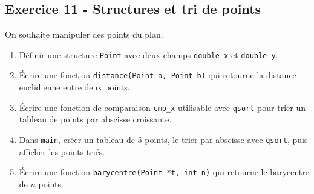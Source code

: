 \documentclass[12pt,a4paper]{article}
\begin{document}
\subsection*{Exercice 11 - Structures et tri de points \niveau{\moyen}}

\begin{boiteexercice}
On souhaite manipuler des points du plan.
\begin{enumerate}
  \item Définir une structure \texttt{Point} avec deux champs \texttt{double x} et \texttt{double y}.
  \item Écrire une fonction \texttt{distance(Point a, Point b)} qui retourne la distance euclidienne entre deux points.
  \item Écrire une fonction de comparaison \texttt{cmp\_x} utilisable avec \texttt{qsort} pour trier un tableau de points par abscisse croissante.
  \item Dans \texttt{main}, créer un tableau de 5 points, le trier par abscisse avec \texttt{qsort}, puis afficher les points triés.
  \item Écrire une fonction \texttt{barycentre(Point *t, int n)} qui retourne le barycentre de $n$ points.
\end{enumerate}
\end{boiteexercice}
\end{document}
